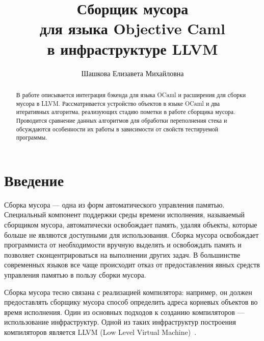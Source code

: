 \title{Сборщик мусора\\
для языка Objective Caml\\
в инфраструктуре LLVM}
%
\author{Шашкова Елизавета Михайловна}
%
%
%

\maketitle              %

\setcounter{algorithm}{0}

\begin{abstract}
В работе описывается интеграция бэкенда для языка OCaml и расширения для сборки мусора в LLVM. 
Рассматривается устройство объектов в языке OCaml и два итеративных алгоритма, реализующих 
стадию пометки в работе сборщика мусора. Проводится сравнение данных алгоритмов для обработки 
переполнения стека и обсуждаются особенности их работы в зависимости от свойств тестируемой программы.
\end{abstract}

\section*{Введение}

Сборка мусора --- одна из форм автоматического управления памятью. Специальный компонент поддержки среды времени исполнения, 
называемый сборщиком мусора, автоматически освобождает 
память, удаляя объекты, которые больше не являются доступными для использования.  Сборка мусора освобождает программиста от 
необходимости вручную выделять и освобождать память и позволяет сконцентрироваться на выполнении других задач.
В большинстве современных языков все чаще происходит отказ от предоставления явных средств управления памятью в пользу сборки мусора.

Сборка мусора тесно связана с реализацией компилятора: например, он должен предоставлять сборщику мусора способ определить адреса корневых объектов во
время исполнения. Один из основных
подходов к созданию компиляторов --- использование инфраструктур. Одной из таких инфраструктур построения компиляторов является LLVM 
(Low Level Virtual Machine)~\cite{LLVM}. 


